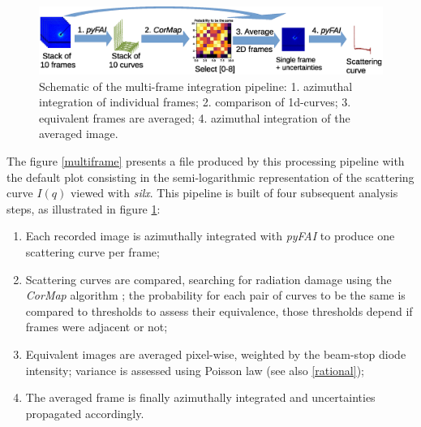 \documentclass[preprint]{iucr}              %
\begin{document}
\begin{figure}
     \label{multiframe_worflow}
     \begin{center} 
     \caption{Schematic of the multi-frame integration pipeline: 
     1. azimuthal integration of individual frames; 
     2. comparison of 1d-curves;
     3. equivalent frames are averaged;
     4. azimuthal integration of the averaged image.}
     \includegraphics[width=12cm]{multiframe_pipeline.eps}
     \end{center}
\end{figure}

The figure \ref{multiframe} presents a file produced by this processing pipeline with the default plot consisting in the semi-logarithmic representation of the scattering curve $I(q)$ viewed with \textit{silx}.
This pipeline is built of four subsequent analysis steps, as illustrated in figure \ref{multiframe_worflow}:
\begin{enumerate}
\item Each recorded image is azimuthally integrated with \textit{pyFAI} \cite{pyfai_2020} to produce one scattering curve per frame;
\item Scattering curves are compared, searching for radiation damage using the \textit{CorMap} algorithm \cite{CorMap}; the probability for each pair of curves to be the same is compared to thresholds to assess their equivalence, those thresholds depend if frames were adjacent or not;
\item Equivalent images are averaged pixel-wise, weighted by the beam-stop diode intensity; variance is assessed using Poisson law (see also \ref{rational});
\item The averaged frame is finally azimuthally integrated and uncertainties propagated accordingly. 
\end{enumerate}
\end{document}
